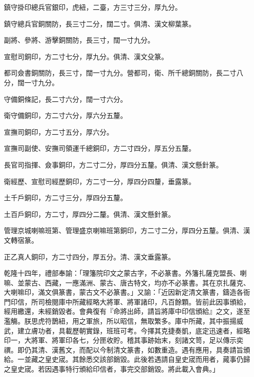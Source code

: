 \begin{pinyinscope}
鎮守掛印總兵官銀印，虎紐，二臺，方三寸三分，厚九分。

鎮守總兵官銅關防，長三寸二分，闊二寸。俱清、漢文柳葉篆。

副將、參將、游擊銅關防，長三寸，闊一寸九分。

宣慰司銅印，方二寸七分，厚九分。俱清、漢文殳篆。

都司僉書銅關防，長三寸，闊一寸九分。營都司，衛、所千總銅關防，長二寸八分，闊一寸九分。

守備銅條記，長二寸六分，闊一寸六分。

衛守備銅印，方二寸六分，厚六分五釐。

宣撫司銅印，方二寸五分，厚六分。

宣撫司副使、安撫司領運千總銅印，方二寸四分，厚五分五釐。

長官司指揮、僉事銅印，方二寸二分，厚四分五釐。俱清、漢文懸針篆。

衛經歷、宣慰司經歷銅印，方二寸一分，厚四分四釐，垂露篆。

土千戶銅印，方二寸三分，厚四分五釐。

土百戶銅印，方二寸，厚四分二釐。俱清、漢文懸針篆。

管理京城喇嘛班第、管理盛京喇嘛班第銅印，方二寸二分，厚四分五釐。俱清、漢文轉宿篆。

正乙真人銅印，方二寸四分，厚五分。清、漢文垂露篆。

乾隆十四年，禮部奉諭：「理籓院印文之蒙古字，不必篆書。外籓扎薩克盟長、喇嘛、並蒙古、西藏，一應滿洲、蒙古、唐古特文，均亦不必篆書。其在京扎薩克、大喇嘛印，滿文俱篆書，蒙古文不必篆書。」又諭：「近因新定清文篆書，鑄造各衙門印信，所司檢閱庫中所藏經略大將軍、將軍諸印，凡百餘顆。皆前此因事頒給，經用繳還，未經銷毀者。會典復有『命將出師，請旨將庫中印信頒給』之文，遂至濫觴。朕思虎符鵲紐，用之軍旅，所以昭信，無取繁多。庫中所藏，其中振揚威武，建立膚功者，具載歷朝實錄，班班可考。今擇其克捷奏凱，底定迅速者，經略印一，大將軍、將軍印各七，分匣收貯。稽其事跡始末，刻諸文笥，足以傳示奕禩。即仍其清、漢舊文，而配以今制清文篆書，如數重造。遇有應用，具奏請旨頒給。一並藏之皇史宬。其餘悉交該部銷毀。此後若遇請自皇史宬而用者，蕆事仍歸之皇史宬。若因遇事特行頒給印信者，事完交部銷毀。將此載入會典。」


\end{pinyinscope}
